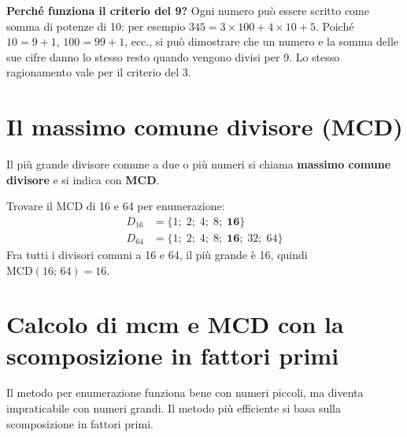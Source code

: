 \begin{sapevi}
    \textbf{Perché funziona il criterio del 9?}
    Ogni numero può essere scritto come somma di potenze di 10:
    per esempio $345 = 3 \times 100 + 4 \times 10 + 5$. Poiché
    $10 = 9 + 1$, $100 = 99 + 1$, ecc., si può dimostrare che un numero e la
    somma delle sue cifre danno lo stesso resto quando vengono divisi per 9.
    Lo stesso ragionamento vale per il criterio del 3.
\end{sapevi}

\section{Il massimo comune divisore (MCD)}

\begin{definizione}
    Il più grande divisore comune a due o più numeri si chiama
    \textbf{massimo comune divisore} e si indica con \textbf{MCD}.
\end{definizione}

\begin{esempio}
    Trovare il MCD di 16 e 64 per enumerazione:
    \begin{align*}
        D_{16} & = \{1;\; 2;\; 4;\; 8;\; \mathbf{16}\}             \\
        D_{64} & = \{1;\; 2;\; 4;\; 8;\; \mathbf{16};\; 32;\; 64\}
    \end{align*}
    Fra tutti i divisori comuni a 16 e 64, il più grande è 16,
    quindi $\text{MCD}(16;\, 64) = 16$.
\end{esempio}

\section{Calcolo di mcm e MCD con la scomposizione in fattori primi}

Il metodo per enumerazione funziona bene con numeri piccoli, ma diventa
impraticabile con numeri grandi. Il metodo più efficiente si basa sulla
scomposizione in fattori primi.

